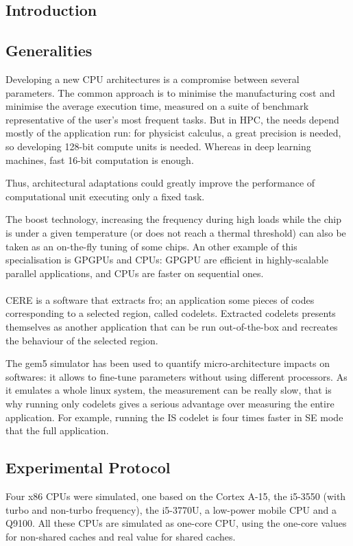 \documentclass{article}
\begin{document}
\begin{multicols}{2}

\section{Introduction}
\subsection{Generalities}
Developing a new CPU architectures is a compromise between several parameters. The common approach is to minimise the manufacturing cost and minimise the average execution time, measured on a suite of benchmark representative of the user's most frequent tasks. But in HPC, the needs depend mostly of the application run: for physicist calculus, a great precision is needed, so developing 128-bit compute units is needed. Whereas in deep learning machines, fast 16-bit computation is enough.

Thus, architectural adaptations could greatly improve the performance of computational unit executing only a fixed task.

The boost technology, increasing the frequency during high loads while the chip is under a given temperature (or does not reach a thermal threshold) can also be taken as an on-the-fly tuning of some chips. An other example of this specialisation is GPGPUs and CPUs: GPGPU are efficient in highly-scalable parallel applications, and CPUs are faster on sequential ones.



\paragraph{}
CERE is a software that extracts fro; an application some pieces of codes corresponding to a selected region, called codelets. Extracted codelets presents themselves as another application that can be run out-of-the-box and recreates the behaviour of the selected region.


The gem5 simulator\cite{gem5-sim} has been used to quantify micro-architecture impacts on softwares: it allows to fine-tune parameters without using different processors. As it emulates a whole linux system, the measurement can be really slow, that is why running only codelets gives a serious advantage over measuring the entire application. For example, running the IS codelet is four times faster in SE mode that the full application.


\subsection{Experimental Protocol}
Four x86 CPUs were simulated, one based on the Cortex A-15\cite{DBLP:conf/samos/EndoCC14}, the i5-3550 (with turbo and non-turbo frequency), the i5-3770U, a low-power mobile CPU and a Q9100. All these CPUs are simulated as one-core CPU, using the one-core values for non-shared caches and real value for shared caches.


\end{multicols}
\end{document}
